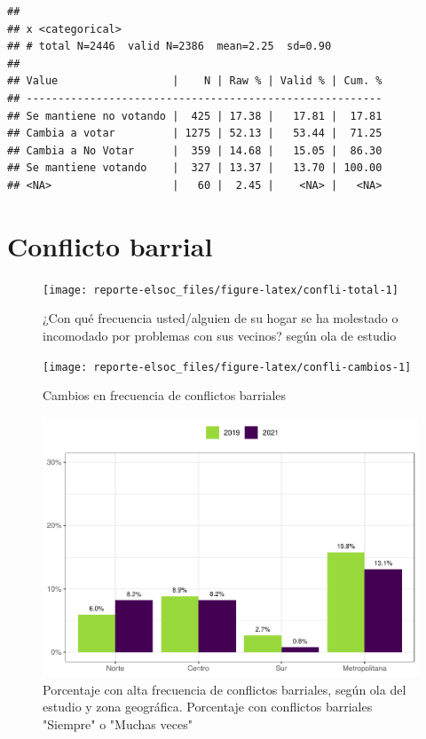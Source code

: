 \documentclass[
  12pt,
  openany]{book}
\begin{document}
\begin{verbatim}
## 
## x <categorical>
## # total N=2446  valid N=2386  mean=2.25  sd=0.90
## 
## Value                  |    N | Raw % | Valid % | Cum. %
## --------------------------------------------------------
## Se mantiene no votando |  425 | 17.38 |   17.81 |  17.81
## Cambia a votar         | 1275 | 52.13 |   53.44 |  71.25
## Cambia a No Votar      |  359 | 14.68 |   15.05 |  86.30
## Se mantiene votando    |  327 | 13.37 |   13.70 | 100.00
## <NA>                   |   60 |  2.45 |    <NA> |   <NA>
\end{verbatim}

\hypertarget{conflicto-barrial}{%
\section{Conflicto barrial}\label{conflicto-barrial}}

\begin{figure}

{\centering \texttt{[image: reporte-elsoc\_files/figure-latex/confli-total-1]} 

}

\caption{¿Con qué frecuencia usted/alguien de su hogar se ha molestado o incomodado por problemas con sus vecinos? según ola de estudio }\label{fig:confli-total}
\end{figure}

\begin{figure}

{\centering \texttt{[image: reporte-elsoc\_files/figure-latex/confli-cambios-1]} 

}

\caption{Cambios en frecuencia de conflictos barriales}\label{fig:confli-cambios}
\end{figure}

\begin{figure}

{\centering \includegraphics{reporte-elsoc_files/figure-latex/confli-zona-1} 

}

\caption{Porcentaje con alta frecuencia de conflictos barriales, según ola del estudio y zona geográfica. Porcentaje con conflictos barriales "Siempre" o "Muchas veces"}\label{fig:confli-zona}
\end{figure}
\end{document}
